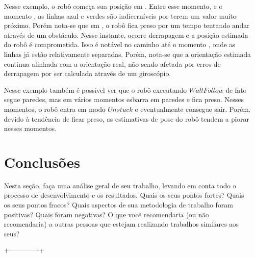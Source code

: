 \documentclass[twoside,conference,a4paper]{IEEEtran}
\newcommand*\circled[1]{\tikz[baseline=(char.base)]{
            \node[shape=circle,draw,inner sep=1pt] (char) {#1};}}
\begin{document}
Nesse exemplo, o robô começa sua posição em \circled{1}. Entre esse momento, e o momento \circled{2}, as linhas azul e verdes são indicerníveis por terem um valor muito próximo. Porém nota-se que em \circled{2}, o robô fica preso por um tempo tentando andar através de um obstáculo. Nesse instante, ocorre derrapagem e a posição estimada do robô é comprometida. Isso é notável no caminho até o momento \circled{3}, onde as linhas já estão relativamente separadas. Porém, nota-se que a orientação estimada continua alinhada com a orientação real, não sendo afetada por erros de derrapagem por ser calculada através de um giroscópio.

Nesse exemplo também é possível ver que o robô executando $Wall Follow$ de fato segue paredes, mas em vários momentos esbarra em paredes e fica preso. Nesses momentos, o robô entra em modo $Unstuck$ e eventualmente consegue sair. Porém, devido à tendência de ficar preso, as estimativas de pose do robô tendem a piorar nesses momentos.

\section{Conclusões}

Nesta seção, faça uma análise geral de seu trabalho, levando em conta todo o processo de desenvolvimento e os resultados. Quais os seus pontos fortes? Quais os seus pontos fracos? Quais aspectos de sua metodologia de trabalho foram positivas? Quais foram negativas? O que você recomendaria (ou não recomendaria) a outras pessoas que estejam realizando trabalhos similares aos seus? 


 +-------------+





\end{document}

